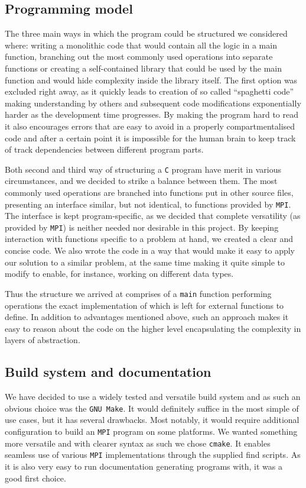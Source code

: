 \documentclass[11pt,a4paper]{article}
\begin{document}
\subsection{Programming model}
\label{sec:model}
The three main ways in which the program could be structured we considered where: writing a monolithic code that would contain all the logic in a main function, branching out the most commonly used operations into separate functions or creating a self-contained library that could be used by the main function and would hide complexity inside the library itself.
The first option was excluded right away, as it quickly leads to creation of so called ``spaghetti code'' making understanding by others and subsequent code modifications exponentially harder as the development time progresses. 
By making the program hard to read it also encourages errors that are easy to avoid in a properly compartmentalised code and after a certain point it is impossible for the human brain to keep track of track dependencies between different program parts.

Both second and third way of structuring a \texttt{C} program have merit in various circumstances, and we decided to strike a balance between them. 
The most commonly used operations are branched into functions put in other source files, presenting an interface similar, but not identical, to functions provided by \texttt{MPI}.
The interface is kept program-specific, as we decided that complete versatility (as provided by \texttt{MPI}) is neither needed nor desirable in this project. 
By keeping interaction with functions specific to a problem at hand, we created a clear and concise code.
We also wrote the code in a way that would make it easy to apply our solution to a similar problem, at the same time making it quite simple to modify to enable, for instance, working on different data types.

Thus the structure we arrived at comprises of a \texttt{main} function performing operations the exact implementation of which is left for external functions to define. 
In addition to advantages mentioned above, such an approach makes it easy to reason about the code on the higher level encapsulating the complexity in layers of abstraction.

\subsection{Build system and documentation}
We have decided to use a widely tested and versatile build system and as such an obvious choice was the \texttt{GNU Make}. 
It would definitely suffice in the most simple of use cases, but it has several drawbacks. 
Most notably, it would require additional configuration to build an \texttt{MPI} program on some platforms. 
We wanted something more versatile and with clearer syntax as such we chose \texttt{cmake}. 
It enables seamless use of various \texttt{MPI} implementations through the supplied find scripts. 
As it is also very easy to run documentation generating programs with, it was a good first choice.
\end{document}
